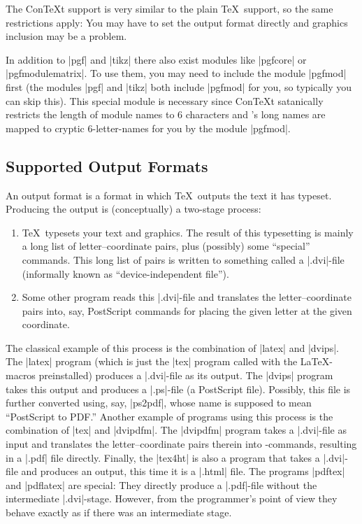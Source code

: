 The Con\TeX t support is very similar to the plain \TeX\ support, so
the same restrictions apply: You may have to set the output
format directly and graphics inclusion may be a problem.

In addition to |pgf| and |tikz| there also exist modules like
|pgfcore| or |pgfmodulematrix|. To
use them, you may need to include the module |pgfmod| first (the
modules |pgf| and |tikz| both include |pgfmod| for you, so typically
you can skip this). This special module is necessary since Con\TeX t
satanically restricts the length of module names to 6 characters
and \pgfname's long names are mapped
to cryptic 6-letter-names for you by the module |pgfmod|.





\subsection{Supported Output Formats}
\label{section-drivers}

An output format is a format in which \TeX\ outputs the text it has
typeset. Producing the output is (conceptually) a two-stage process:
\begin{enumerate}
\item
  \TeX\ typesets your text and graphics. The result of this
  typesetting is mainly a long list of letter--coordinate pairs, plus
  (possibly) some ``special'' commands. This long list of pairs
  is written to something called a |.dvi|-file (informally known as
  ``device-independent file'').
\item
  Some other program reads this |.dvi|-file and translates the
  letter--coordinate pairs into, say, PostScript commands for placing
  the given letter at the given coordinate.
\end{enumerate}

The classical example of this process is the combination of |latex|
and |dvips|. The |latex| program (which is just the |tex| program
called with the \LaTeX-macros preinstalled) produces a |.dvi|-file as
its output. The |dvips| program takes this output and produces a
|.ps|-file (a PostScript file). Possibly, this file is further
converted using, say, |ps2pdf|, whose name is supposed to mean
``PostScript to PDF.'' Another example of programs using this
process is the combination of |tex| and |dvipdfm|. The |dvipdfm|
program takes a |.dvi|-file as
input and translates the letter--coordinate pairs therein into
\pdf-commands, resulting in a |.pdf| file directly. Finally, the
|tex4ht| is also a program that takes a |.dvi|-file and produces an
output, this time it is a |.html| file. The programs |pdftex| and
|pdflatex| are special: They directly produce a |.pdf|-file without
the intermediate |.dvi|-stage. However, from the programmer's point of
view they behave exactly as if there was an intermediate stage.

